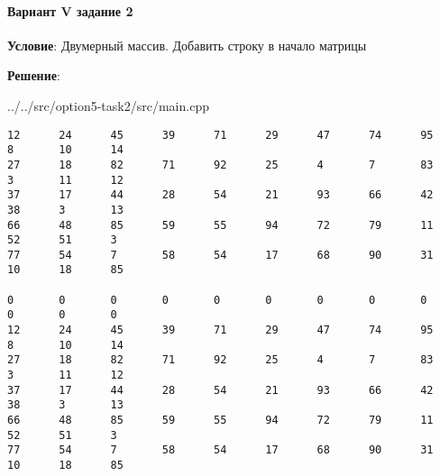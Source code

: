 \paragraph{Вариант V задание 2} \hspace{0pt}

\textbf{Условие}:
Двумерный массив.
Добавить строку в начало матрицы

\textbf{Решение}:


{../../src/option5-task2/src/main.cpp}

\begin{lstlisting}[language=Out,]
12      24      45      39      71      29      47      74      95      8       10      14
27      18      82      71      92      25      4       7       83      3       11      12
37      17      44      28      54      21      93      66      42      38      3       13
66      48      85      59      55      94      72      79      11      52      51      3
77      54      7       58      54      17      68      90      31      10      18      85

0       0       0       0       0       0       0       0       0       0       0       0
12      24      45      39      71      29      47      74      95      8       10      14
27      18      82      71      92      25      4       7       83      3       11      12
37      17      44      28      54      21      93      66      42      38      3       13
66      48      85      59      55      94      72      79      11      52      51      3
77      54      7       58      54      17      68      90      31      10      18      85
\end{lstlisting}